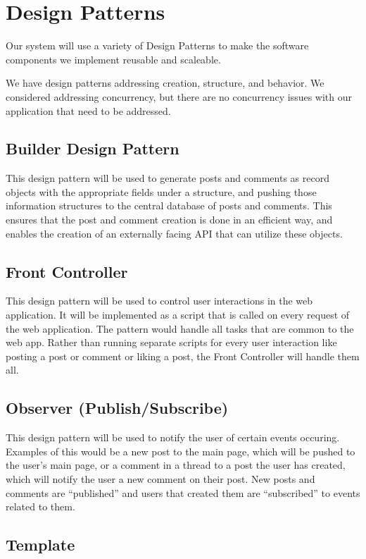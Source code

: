 \documentclass[12pt]{article}
\begin{document}
\section{Design Patterns}
Our system will use a variety of Design Patterns to make the software components we implement reusable and scaleable.

We have design patterns addressing creation, structure, and behavior. We considered addressing concurrency, but there are no concurrency issues with our application that need to be addressed.

\subsection{Builder Design Pattern}

This design pattern will be used to generate posts and comments as record objects with the appropriate fields under a structure, and pushing those information structures to the central database of posts and comments. This ensures that the post and comment creation is done in an efficient way, and enables the creation of an externally facing API that can utilize these objects.

\subsection{Front Controller}

This design pattern will be used to control user interactions in the web application. It will be implemented as a script that is called on every request of the web application. The pattern would handle all tasks that are common to the web app. Rather than running separate scripts for  every user interaction like posting a post or comment or liking a post, the Front Controller will handle them all.

\subsection{Observer (Publish/Subscribe)}

This design pattern will be used to notify the user of certain events occuring. Examples of this would be a new post to the main page, which will be pushed to the user’s main page, or a comment in a thread to a post the user has created, which will notify the user a new comment on their post. New posts and comments are “published” and users that created them are “subscribed” to events related to them.

\subsection{Template}
\end{document}
